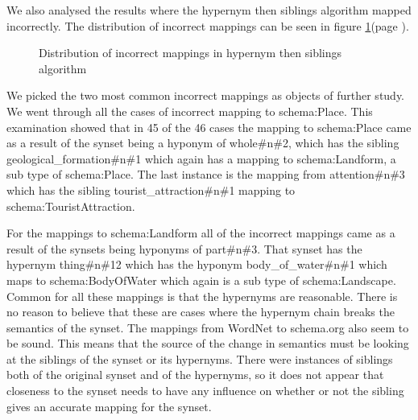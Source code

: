 We also analysed the results where the hypernym then siblings algorithm mapped incorrectly.
The distribution of incorrect mappings can be seen in figure \ref{fig:incorrect}(page \pageref{fig:incorrect}).

\begin{figure}[ht]
	\centering
	\caption{Distribution of incorrect mappings in hypernym then siblings algorithm}
	\label{fig:incorrect}
\end{figure}

We picked the two most common incorrect mappings as objects of further study.
We went through all the cases of incorrect mapping to schema:Place.
This examination showed that in 45 of the 46 cases the mapping to schema:Place came as a result of
the synset being a hyponym of whole\#n\#2, which has the sibling geological\_formation\#n\#1 which again has a mapping to
schema:Landform, a sub type of schema:Place.
The last instance is the mapping from attention\#n\#3 which has the sibling tourist\_attraction\#n\#1 mapping to
schema:TouristAttraction.

For the mappings to schema:Landform all of the incorrect mappings came as a result of the synsets being hyponyms of part\#n\#3.
That synset has the hypernym thing\#n\#12 which has the hyponym body\_of\_water\#n\#1 which maps
to schema:BodyOfWater which again is a sub type of schema:Landscape.
Common for all these mappings is that the hypernyms are reasonable.
There is no reason to believe that these are cases where the hypernym chain breaks the semantics of the synset.
The mappings from WordNet to schema.org also seem to be sound.
This means that the source of the change in semantics must be looking at the siblings of the synset or its hypernyms.
There were instances of siblings both of the original synset and of the hypernyms,
so it does not appear that closeness to the synset needs to have any influence on whether or not the sibling gives
an accurate mapping for the synset.


